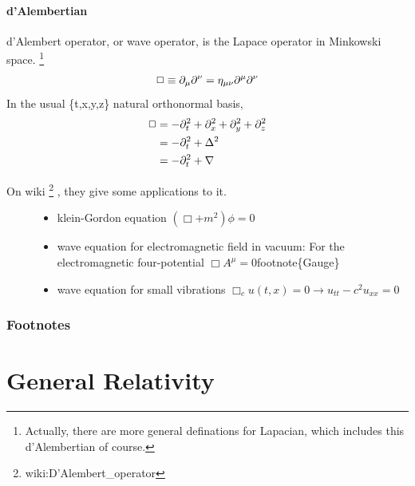 \documentclass[letterpaper,10pt,english]{sphinxmanual}
\begin{document}
\paragraph{d'Alembertian}
\label{relativity/SpecialRelativity:d-alembertian}
d'Alembert operator, or wave operator, is the Lapace operator in Minkowski space. \footnote{
Actually, there are more general definations for Lapacian, which includes this d'Alembertian of course.
}
\begin{gather}
\begin{split}\Box \equiv \partial _ \mu\partial^\nu = \eta _{\mu\nu}\partial^\mu \partial^\nu\end{split}\notag
\end{gather}
In the usual \{t,x,y,z\} natural orthonormal basis,
\begin{gather}
\begin{split}\Box & = -\partial_t^2+\partial_x^2+\partial_y^2+\partial_z^2 \\
& = -\partial_t^2+\Delta^2 \\
& = -\partial_t^2+\nabla\end{split}\notag
\end{gather}\begin{description}
\item[{On wiki \footnote{
wiki:D'Alembert\_operator
} , they give some applications to it.}] \leavevmode\begin{itemize}
\item {} 
klein-Gordon equation
\((\Box+m^2)\phi=0\)

\item {} 
wave equation for electromagnetic field in vacuum:
For the electromagnetic four-potential \(\Box A^\mu=0\)footnote\{Gauge\}

\item {} 
wave equation for small vibrations
\(\Box_c u(t,x)=0\rightarrow u_{tt}-c^2 u_{xx}=0\)

\end{itemize}

\end{description}


\subsubsection{Footnotes}
\label{relativity/SpecialRelativity:footnotes}

\section{General Relativity}
\label{relativity/GeneralRelativity::doc}\label{relativity/GeneralRelativity:general-relativity}
\end{document}
